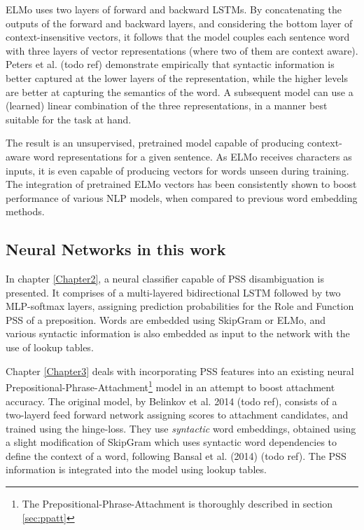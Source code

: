 ELMo uses two layers of forward and backward LSTMs. By concatenating the outputs of the forward and backward layers, and considering the bottom layer of context-insensitive vectors, it follows that the model couples each sentence word with three layers of vector representations (where two of them are context aware). Peters et al. (todo ref) demonstrate empirically that syntactic information is better captured at the lower layers of the representation, while the higher levels are better at capturing the semantics of the word.  A subsequent model can use a (learned) linear combination of the three representations, in a manner best suitable for the task at hand. 

The result is an unsupervised, pretrained model capable of producing context-aware word representations for a given sentence. As ELMo receives characters as inputs, it is even capable of producing vectors for words unseen during training. The integration of pretrained ELMo vectors has been consistently shown to boost performance of various NLP models, when compared to previous word embedding methods. 

\subsection{Neural Networks in this work}

In chapter \ref{Chapter2}, a neural classifier capable of PSS disambiguation is presented. It comprises of a multi-layered bidirectional LSTM followed by two MLP-softmax layers, assigning prediction probabilities for the Role and Function PSS of a preposition. Words are embedded using SkipGram or ELMo, and various syntactic information is also embedded as input to the network with the use of lookup tables. 

Chapter \ref{Chapter3} deals with incorporating PSS features into an existing neural Prepositional-Phrase-Attachment\footnote{The Prepositional-Phrase-Attachment is thoroughly described in section \ref{sec:ppatt}} model in an attempt to boost attachment accuracy. The original model, by Belinkov et al. 2014 (todo ref), consists of a two-layerd feed forward network assigning scores to attachment candidates, and trained using the hinge-loss. They use \emph{syntactic} word embeddings, obtained using a slight modification of SkipGram which uses syntactic word dependencies to define the context of a word, following Bansal et al. (2014) (todo ref). The PSS information is integrated into the model using lookup tables.

